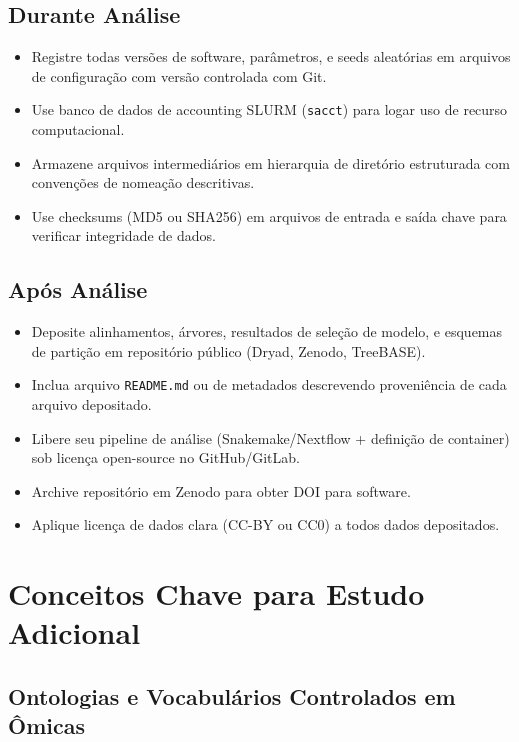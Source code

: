 \subsection{Durante Análise}

\begin{itemize}
\item [ ] Registre todas versões de software, parâmetros, e seeds aleatórias em arquivos de configuração com versão controlada com Git.
\item [ ] Use banco de dados de accounting SLURM (\texttt{sacct}) para logar uso de recurso computacional.
\item [ ] Armazene arquivos intermediários em hierarquia de diretório estruturada com convenções de nomeação descritivas.
\item [ ] Use checksums (MD5 ou SHA256) em arquivos de entrada e saída chave para verificar integridade de dados.
\end{itemize}

\subsection{Após Análise}

\begin{itemize}
\item [ ] Deposite alinhamentos, árvores, resultados de seleção de modelo, e esquemas de partição em repositório público (Dryad, Zenodo, TreeBASE).
\item [ ] Inclua arquivo \texttt{README.md} ou de metadados descrevendo proveniência de cada arquivo depositado.
\item [ ] Libere seu pipeline de análise (Snakemake/Nextflow + definição de container) sob licença open-source no GitHub/GitLab.
\item [ ] Archive repositório em Zenodo para obter DOI para software.
\item [ ] Aplique licença de dados clara (CC-BY ou CC0) a todos dados depositados.
\end{itemize}

\section{Conceitos Chave para Estudo Adicional}

\subsection{Ontologias e Vocabulários Controlados em Ômicas}

